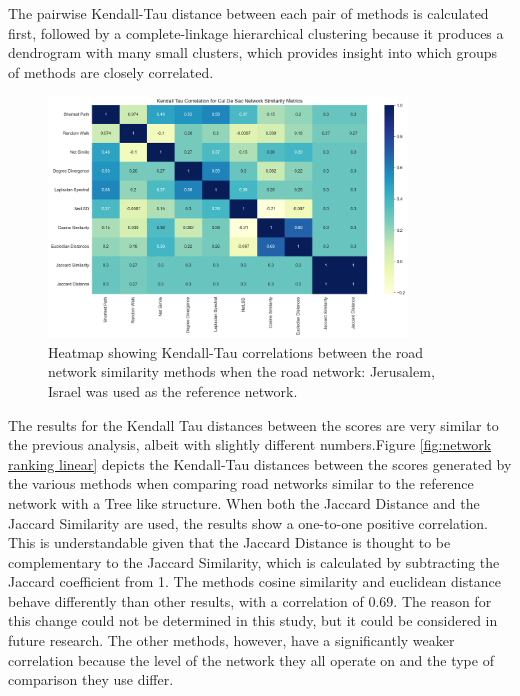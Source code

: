 The pairwise Kendall-Tau distance between each pair of methods is calculated first, followed by a complete-linkage hierarchical clustering because it produces a dendrogram with many small clusters, which provides insight into which groups of methods are closely correlated.

\begin{figure}[!ht]
\centering
\includegraphics[width=0.85\textwidth,center]{picture/Cul De Sac/culdesac2.png}
\caption[Heatmap showing Kendall-Tau correlations between the road network similarity methods for Cul De Sac Road Networks]{Heatmap showing Kendall-Tau correlations between the road network similarity methods when the road network: Jerusalem, Israel was used as the reference network.}
\label{fig:network ranking Cul De Sac}
\end{figure}

The results for the Kendall Tau distances between the scores are very similar to the previous analysis, albeit with slightly different numbers.Figure \ref{fig:network ranking linear} depicts the Kendall-Tau distances between the scores generated by the various methods when comparing road networks similar to the reference network with a Tree like structure. When both the Jaccard Distance and the Jaccard Similarity are used, the results show a one-to-one positive correlation. This is understandable given that the Jaccard Distance is thought to be complementary to the Jaccard Similarity, which is calculated by subtracting the Jaccard coefficient from 1. The methods cosine similarity and euclidean distance behave differently than other results, with a correlation of 0.69. The reason for this change could not be determined in this study, but it could be considered in future research. The other methods, however, have a significantly weaker correlation because the level of the network they all operate on and the type of comparison they use differ.